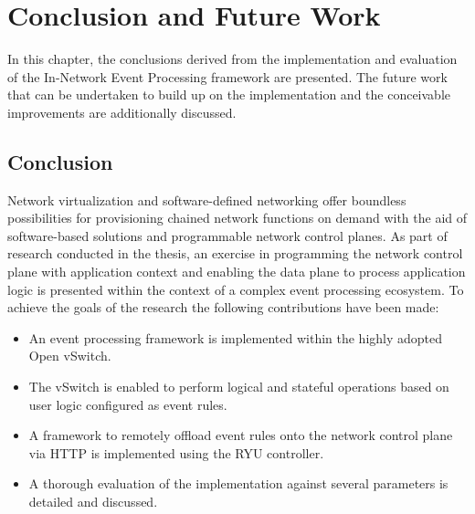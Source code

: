 \chapter{Conclusion and Future Work}
In this chapter, the conclusions derived from the implementation and evaluation of the In-Network Event Processing framework are presented. The future work that can be undertaken to build up on the implementation and the conceivable improvements are additionally discussed. 




\section{Conclusion}
Network virtualization and software-defined networking offer boundless possibilities for provisioning chained network functions on demand with the aid of software-based solutions and programmable network control planes. As part of research conducted in the thesis, an exercise in programming the network control plane with application context and enabling the data plane to process application logic is presented within the context of a complex event processing ecosystem. To achieve the goals of the research the following contributions have been made:
\begin{itemize}
	\item An event processing framework is implemented within the highly adopted Open vSwitch.
	\item The vSwitch is enabled to perform logical and stateful operations based on user logic configured as event rules.
	\item A framework to remotely offload event rules onto the network control plane via HTTP is implemented using the RYU controller.
	\item A thorough evaluation of the implementation against several parameters is detailed and discussed.
\end{itemize}
